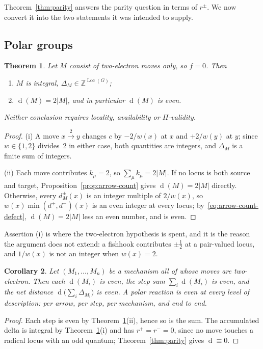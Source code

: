\documentclass[11pt]{article}
\numberwithin{equation}{section}
\newcommand{\Loc}{\operatorname{Loc}}
\newcommand{\del}{\operatorname{d}}
\theoremstyle{plain}
\newtheorem{theorem}{Theorem}[section]
\newtheorem{corollary}[theorem]{Corollary}
\theoremstyle{definition}
\theoremstyle{remark}
\begin{document}
Theorem~\ref{thm:parity} answers the parity question in terms of $r^\pm$.  We
now convert it into the two statements it was intended to supply.

\subsection{Polar groups}

\begin{theorem}
\label{thm:polar}
Let $M$ consist of two-electron moves only, so $f=0$.  Then
\begin{enumerate}
\item[(i)] $M$ is integral, $\Delta_M\in\mathbb Z^{\Loc(G)}$;
\item[(ii)] $\del(M)=2|M|$, and in particular $\del(M)$ is even.
\end{enumerate}
Neither conclusion requires locality, availability or $\Pi$-validity.
\end{theorem}

\begin{proof}
(i) A move $x\xrightarrow{2}y$ changes $c$ by $-2/w(x)$ at $x$ and $+2/w(y)$
at $y$; since $w\in\{1,2\}$ divides~$2$ in either case, both quantities are
integers, and $\Delta_M$ is a finite sum of integers.

(ii) Each move contributes $k_\mu=2$, so $\sum_\mu k_\mu=2|M|$.  If no locus
is both source and target, Proposition~\ref{prop:arrow-count}
gives $\del(M)=2|M|$ directly.  Otherwise, every $d^\pm_M(x)$ is an integer
multiple of $2/w(x)$, so $w(x)\min(d^+,d^-)(x)$ is an even integer at every
locus; by~\eqref{eq:arrow-count-defect}, $\del(M)=2|M|$ less an even number,
and is even.
\end{proof}

Assertion (i) is where the two-electron hypothesis is spent, and it is the
reason the argument does not extend: a fishhook contributes $\pm\tfrac12$ at a
pair-valued locus, and $1/w(x)$ is not an integer when $w(x)=2$.

\begin{corollary}
\label{cor:polar-mechanism}
Let $(M_1,\dots,M_n)$ be a mechanism all of whose moves are two-electron.
Then each $\del(M_i)$ is even, the step sum $\sum_i\del(M_i)$ is even, and the
net distance $\del\bigl(\sum_i\Delta_{M_i}\bigr)$ is even.  A polar reaction is
even at every level of description: per arrow, per step, per mechanism, and
end to end.
\end{corollary}

\begin{proof}
Each step is even by Theorem~\ref{thm:polar}(ii), hence so is the sum.  The
accumulated delta is integral by Theorem~\ref{thm:polar}(i) and has
$r^+=r^-=0$, since no move touches a radical locus with an odd quantum;
Theorem~\ref{thm:parity} gives $\del\equiv0$.
\end{proof}
\end{document}

